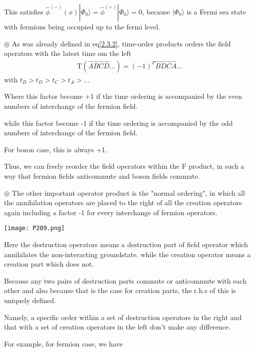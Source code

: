 ﻿\documentclass[twoside]{book}
\numberwithin{equation}{section}
\begin{document}
This satisfies $\hat \phi^{(-)}(x)|\Phi_0\rangle=\hat \phi ^{(+)}|\Phi_0\rangle=0$, because $|\Phi_0\rangle$ is a Fermi sea state with fermions being occupied up to the fermi level.

$\circledcirc$ As was already defined in eq\ref{2.3.2}, time-order products orders the field operators with the latest time om the left
\begin{align}
\mathrm{T}(\hat{A}\hat{B}\hat{C}\hat{D}...)=(-1)^P\hat{B}\hat{D}\hat{C}\hat{A}... \nonumber
\end{align}
with $t_B>t_D>t_C>t_A>...$

Where this factor become +1 if the time ordering is accompanied by the even numbers of interchange of the fermion field.

while this factor become -1 if the time ordering is accompanied by the odd numbers of interchange of the fermion field.

For boson case, this is always +1.

Thus, we can freely reorder the field operators within the F product, in such a way that fermion fields anticommute and boson fields commute.

$\circledcirc$ The other important operator product is the "normal ordering", in which all the annihilation operators are placed to the right of all the creation operators again including a factor -1 for every interchange of fermion operators.
 \begin{center}
\texttt{[image: P209.png]}
\end{center}
Here the destruction operators means a destruction part of field operator which annihilates the non-interacting groundstate. while the creation operator means a creation part which does not.

Because any two pairs of destruction parts commute or anticommute with each other and also because that is the case for creation parts, the r.h.s of this is uniquely defined.

Namely, a specific order within a set of destruction operators in the right and that with a set of creation operators in the left don't make any difference.

For example, for fermion case, we have 
\end{document}

